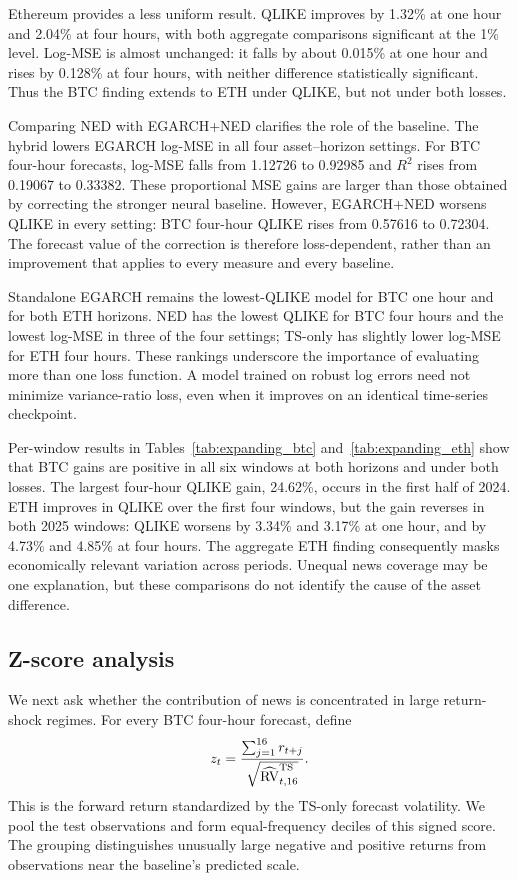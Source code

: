 Ethereum provides a less uniform result. QLIKE improves by 1.32\%
at one hour and 2.04\% at four hours, with both aggregate comparisons
significant at the 1\% level. Log-MSE is almost unchanged: it falls
by about 0.015\% at one hour and rises by 0.128\% at four hours,
with neither difference statistically significant. Thus the BTC
finding extends to ETH under QLIKE, but not under both losses.

Comparing NED with EGARCH+NED clarifies the role of the baseline.
The hybrid lowers EGARCH log-MSE in all four asset--horizon settings.
For BTC four-hour forecasts, log-MSE falls from 1.12726 to 0.92985
and $R^2$ rises from 0.19067 to 0.33382. These proportional MSE
gains are larger than those obtained by correcting the stronger
neural baseline. However, EGARCH+NED worsens QLIKE in every setting:
BTC four-hour QLIKE rises from 0.57616 to 0.72304. The forecast
value of the correction is therefore loss-dependent, rather than
an improvement that applies to every measure and every baseline.

Standalone EGARCH remains the lowest-QLIKE model for BTC one hour
and for both ETH horizons. NED has the lowest QLIKE for BTC four
hours and the lowest log-MSE in three of the four settings; TS-only
has slightly lower log-MSE for ETH four hours. These rankings
underscore the importance of evaluating more than one loss function.
A model trained on robust log errors need not minimize variance-ratio
loss, even when it improves on an identical time-series checkpoint.

Per-window results in Tables~\ref{tab:expanding_btc}
and~\ref{tab:expanding_eth} show that BTC gains are positive in all
six windows at both horizons and under both losses. The largest
four-hour QLIKE gain, 24.62\%, occurs in the first half of 2024.
ETH improves in QLIKE over the first four windows, but the gain
reverses in both 2025 windows: QLIKE worsens by 3.34\% and 3.17\%
at one hour, and by 4.73\% and 4.85\% at four hours. The aggregate
ETH finding consequently masks economically relevant variation
across periods. Unequal news coverage may be one explanation,
but these comparisons do not identify the cause of the asset difference.

\subsection{Z-score analysis}
We next ask whether the contribution of news is concentrated in
large return-shock regimes. For every BTC four-hour forecast, define
\begin{equation}
 z_t=\frac{\sum_{j=1}^{16}r_{t+j}}
            {\sqrt{\widehat{\operatorname{RV}}_{t,16}^{\mathrm{TS}}}}.
\end{equation}
This is the forward return standardized by the TS-only forecast
volatility. We pool the test observations and form equal-frequency
deciles of this signed score. The grouping distinguishes unusually
large negative and positive returns from observations near the
baseline's predicted scale.

